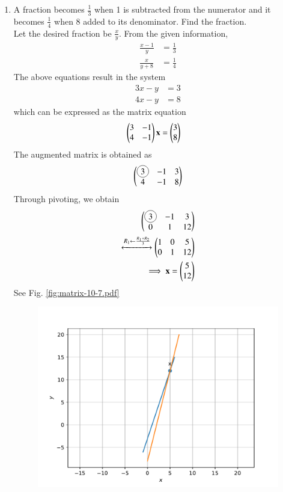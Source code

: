 \documentclass[journal,12pt,twocolumn]{IEEEtran}
\renewcommand\thesection{\arabic{section}}
\begin{document}
\begin{enumerate}[label=\thesection.\arabic*.,ref=\thesection.\theenumi]
     \item A fraction becomes $\frac{1}{3}$ when 1 is subtracted from the numerator and it becomes $\frac{1}{4}$ when 8 added to its denominator. Find the fraction.\\
		\solution Let the desired fraction be $\frac{x}{y}$.  From the given information, 
		    \begin{align}
			    \frac{x-1}{y} &= \frac{1}{3}
			    \\
			    \frac{x}{y+8} &= \frac{1}{4}
		    \end{align}
		    The above equations result in the system 
		    \begin{align}
			    3x - y &= 3
			    \\
			    4x - y &= 8 
		    \end{align}
		    which can be expressed as the matrix equation 
		    \begin{align}
			    \begin{pmatrix}	    3 & -1  
			    \\
			    4 & -1\end{pmatrix} \mathbf{x} &= \begin{pmatrix}3\\8 \end{pmatrix}
		    \end{align}
		    The augmented matrix is obtained as 
		    \begin{align}
			    \myvec{	    \circled{3} & -1  &3
			    \\
			    4 & -1 & 8}  
		    \end{align}
		    Through pivoting, we obtain 
		    \begin{align}
			    \myvec{	    \circled{3} & -1  &3
			    \\
			    0 & 1 & 12}  
			    \\
			    \xleftrightarrow[]{R_1 \leftarrow \frac{R_1 + R_2}{3}}
			    \myvec{	    1 & 0  & 5
			    \\
			    0 & 1 & 12}  
			    \\
			    \implies \vec{x} = \myvec{5\\12}
		    \end{align}
    See Fig. 
	  \ref{fig:matrix-10-7.pdf}
  \begin{figure}
	  \centering 
	  \includegraphics[width=\columnwidth]{figs/matrix-10-7.pdf}

\end{figure}
\end{enumerate}
\end{document}
